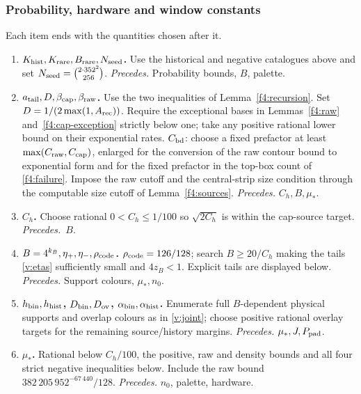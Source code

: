 \subsubsection{Probability, hardware and window constants}\label{f4:order-b}
Each item ends with the quantities chosen after it.
\begin{enumerate}[label=\arabic*.,leftmargin=2em]
\item \textbf{\boldmath\(K_{\rm hist},K_{\rm rare},B_{\rm rare},N_{\rm seed}\).} Use the historical and negative catalogues above and set
\mbox{\(N_{\rm seed}=\tbinom{2\cdot352^2}{256}\)}.
\emph{Precedes.} Probability bounds, \(B\),
palette.

\item \textbf{\boldmath\(a_{\rm tail},D,\beta_{\rm cap},\beta_{\rm raw}\).} Use the two inequalities of Lemma~\ref{f4:recursion}. Set
\mbox{\(D=1/(2\max(1,A_{\rm rec}))\)}. Require the exceptional bases in
Lemmas~\ref{f4:raw} and~\ref{f4:cap-exception} strictly below one;
take any positive rational lower bound on their exponential rates.
\(C_{\rm bd}\): choose a fixed prefactor at least
\(\max(C_{\rm raw},C_{\rm cap})\), enlarged for the conversion of the
raw contour bound to exponential form and for the fixed prefactor in
the top-box count of \eqref{f4:failure}. Impose the raw cutoff and the
central-strip size condition through the computable size cutoff of
Lemma~\ref{f4:sources}.
\emph{Precedes.} \(C_h,B,\mu_*\).

\item \textbf{\boldmath\(C_h\).} Choose rational \(0<C_h\le1/100\) so
\(\sqrt{2C_h}\) is within the cap-source target.
\emph{Precedes.}~\(B\).

\item \textbf{\boldmath\(B=4^{k_B},\eta_+,\eta_-,\rho_{\rm code}\).} \(\rho_{\rm code}=126/128\);
search \(B\ge20/C_h\) making the tails \eqref{v:etas} sufficiently
small and \(4z_B<1\). Explicit tails are displayed below.
\emph{Precedes.} Support
colours, \(\mu_*,n_0\).

\item \textbf{\boldmath\(h_{\rm bin},h_{\rm hist}\), \(D_{\rm bin},D_{\rm ov}\),
\(\alpha_{\rm bin},\alpha_{\rm hist}\).} Enumerate full \(B\)-dependent physical
supports and overlap colours as in \eqref{v:joint}; choose positive
rational overlay targets for the remaining source/history margins.
\emph{Precedes.} \(\mu_*,J,P_{\rm pad}\).

\item \textbf{\boldmath\(\mu_*\).} Rational below \(C_h/100\), the positive, raw and density bounds
and all four strict negative inequalities below. Include the
raw bound \(382\,205\,952^{-67\,440}/128\).
\emph{Precedes.} \(n_0\), palette, hardware.


\end{enumerate}
